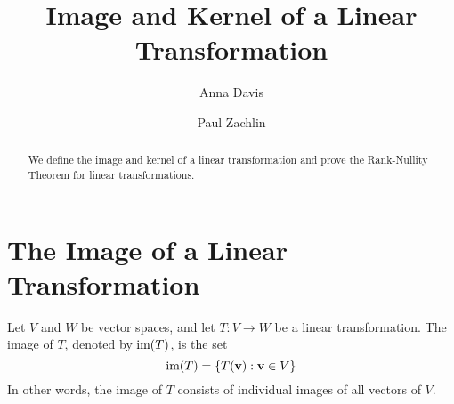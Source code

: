 \documentclass{ximera}
\author{Anna Davis \and Paul Zachlin} \title{Image and Kernel of a Linear Transformation} \license{CC-BY 4.0}
\begin{document}
\begin{abstract}
  We define the image and kernel of a linear transformation and prove the Rank-Nullity Theorem for linear transformations.
\end{abstract}
\maketitle


\section*{The Image of a Linear Transformation}
\begin{definition}\label{def:imageofT}
Let $V$ and $W$ be vector spaces, and let $T:V\rightarrow W$ be a linear transformation.  The image of $T$, denoted by $\textnormal{im}(T)$, is the set
$$\textnormal{im}(T)=\{T(\vec{v}):\vec{v}\in V\}$$
In other words, the image of $T$ consists of individual images of all vectors of $V$.
\end{definition}
\end{document}
